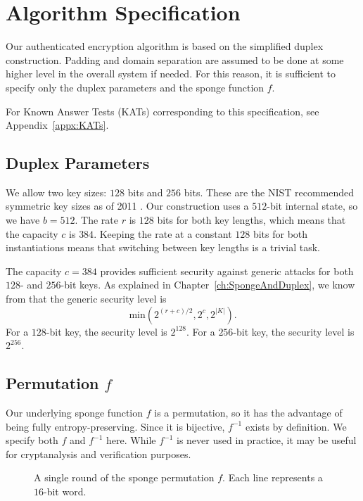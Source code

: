 \chapter{Algorithm Specification}
\label{ch:AlgorithmSpec}
Our authenticated encryption algorithm is based on the simplified duplex construction.
Padding and domain separation are assumed to be done at some higher level in the overall system if needed.
For this reason, it is sufficient to specify only the duplex parameters and the sponge function $f$.

For Known Answer Tests (KATs) corresponding to this specification, see Appendix~\ref{appx:KATs}.

\section{Duplex Parameters}
We allow two key sizes: $128$ bits and $256$ bits.
These are the NIST recommended symmetric key sizes as of 2011 \cite{NIST2011_KeySizes}.
Our construction uses a $512$-bit internal state, so we have $b = 512$.
The rate $r$ is $128$ bits for both key lengths, which means that the capacity $c$ is $384$.
Keeping the rate at a constant $128$ bits for both instantiations means that switching between key lengths is a trivial task.

The capacity $c = 384$ provides sufficient security against generic attacks for both $128$- and $256$-bit keys.
As explained in Chapter~\ref{ch:SpongeAndDuplex}, we know from \cite{Jovanovic2014_Beyond} that the generic security level is
\begin{equation*}
\mathrm{min}(2^{(r+c)/2}, 2^c, 2^{|K|}).
\end{equation*}
For a $128$-bit key, the security level is $2^{128}$.
For a $256$-bit key, the security level is $2^{256}$. 

\section{Permutation $f$}
Our underlying sponge function $f$ is a permutation, so it has the advantage of being fully entropy-preserving.
Since it is bijective, $f^{-1}$ exists by definition.
We specify both $f$ and $f^{-1}$ here.
While $f^{-1}$ is never used in practice, it may be useful for cryptanalysis and verification purposes.

\begin{figure}[p,height=.8\textheight]
\centering

\caption{A single round of the sponge permutation $f$. Each line represents a $16$-bit word.}
\label{fig:Round}
\end{figure}

